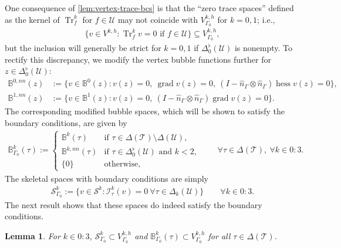 \documentclass{mcom-l}
\newtheorem{lemma}[theorem]{Lemma}
\theoremstyle{definition}
\theoremstyle{remark}
\numberwithin{equation}{section}
\newcommand{\unitvec}[1]{\hat{#1}}
\DeclareMathOperator{\grad}{grad}
\DeclareMathOperator{\hess}{hess}
\DeclareMathOperator{\Tr}{Tr}
\newcommand{\mesh}[0]{\mathcal{T}}
\newcommand{\boundarymesh}[0]{\mathcal{U}}
\begin{document}
One consequence of \cref{lem:vertex-trace-bcs} is that 
the ``zero trace spaces'' defined as the kernel of $\Tr^k_{f}$
for $f \in \boundarymesh$ may not 
coincide with $V_{\Gamma_0}^{k, h}$ for $k=0, 1$; i.e.,
\begin{align*}
	\{ v \in V^{k, h} : \Tr^k_{f} v = 0 
	\text{ if } f \in \boundarymesh \} \subseteq V^{k, h}_{\Gamma_0},
\end{align*}
but the inclusion will generally be strict for $k=0, 1$ if 
$\Delta_0^{\flat}(\boundarymesh)$ is nonempty. 
To rectify this discrepancy, we modify the vertex bubble functions 
further for $z \in \Delta_0^{\flat}(\boundarymesh)$:
\begin{align*}
	\mathbb{B}^{0, nn}(z) 
	&:= \{ v \in  \mathbb{B}^{0}(z) : 
	v(z) = 0, \ \grad v(z) = 0, \
	(I - \unitvec{n}_{\Gamma} 
	\otimes \unitvec{n}_{\Gamma})\hess v(z) 
	= 0 \}, \\
	\mathbb{B}^{1, nn}(z) 
	&:= \{ v \in \mathbb{B}^{1}(z) : 
	v(z) = 0, \
	(I - \unitvec{n}_{\Gamma} 
	\otimes \unitvec{n}_{\Gamma}) 
	\grad v(z) = 0\}.
\end{align*}
The corresponding modified bubble spaces, which will be shown to satisfy 
the boundary conditions, are given by 
\begin{align*}
	\mathbb{B}_{\Gamma_0}^k(\tau) := \begin{cases}
		\mathbb{B}^k(\tau) & \text{if } \tau \in 
		\Delta(\mesh) 
		\setminus \Delta(\boundarymesh), \\
		\mathbb{B}^{k, nn}(\tau) 
		& \text{if } \tau \in \Delta_0^{\flat}(\boundarymesh) 
		\text{ and } k < 2, \\
		\{0\} & \text{otherwise},
	\end{cases} \qquad \forall \tau \in \Delta(\mesh), \ \forall k \in 0:3.
\end{align*}
The skeletal spaces with boundary conditions are simply
\begin{align*}
	\mathcal{S}_{\Gamma_0}^k := \{ v \in \mathcal{S}^k : \mathcal{I}^k_{\tau}(v) = 0
	\ \forall \tau \in \Delta_k(\boundarymesh) \}
	\qquad \forall k \in 0:3. 
\end{align*}
\noindent The next result shows that these spaces do indeed satisfy the boundary 
conditions.
\begin{lemma}
	For $k \in 0:3$, $\mathcal{S}^k_{\Gamma_0} \subset V_{\Gamma_0}^{k, h}$
	and $\mathbb{B}_{\Gamma_0}^k(\tau) \subset V_{\Gamma_0}^{k, h}$ for all 
	$\tau \in \Delta(\mesh)$.
\end{lemma}
\end{document}
